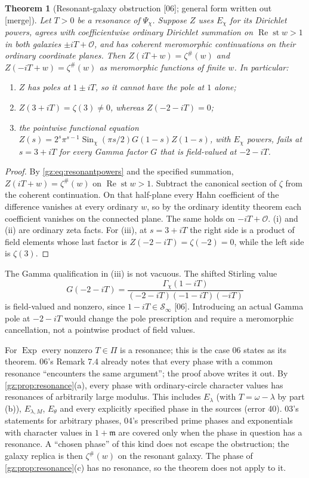 \documentclass[11pt,a4paper]{article}
\numberwithin{equation}{section}
\newtheorem{theorem}{Theorem}[section]
\theoremstyle{definition}
\theoremstyle{remark}
\newcommand{\OO}{\mathcal O}
\newcommand{\mm}{\mathfrak m}
\renewcommand{\Re}{\operatorname{Re}}
\newcommand{\st}{\operatorname{st}}
\newcommand{\Exp}{\operatorname{Exp}}
\newcommand{\Sin}{\operatorname{Sin}}
\newcommand{\zp}{\zeta^{\#}}
\newcommand{\Sinf}{\mathcal S_{\infty}}
\newcommand{\src}[1]{\textup{[#1]}}
\newcommand{\merge}{\textup{[merge]}}
\begin{document}
\begin{theorem}[Resonant-galaxy obstruction \src{06}; general form written out \merge]\label{gz:thm:resonance}
Let $T>0$ be a resonance of $\Psi_\chi$. Suppose $Z$ uses $E_\chi$ for its
Dirichlet powers, agrees with coefficientwise ordinary Dirichlet summation
on $\Re\st w>1$ in both galaxies $\pm iT+\OO$, and has coherent meromorphic
continuations on their ordinary coordinate planes. Then
$Z(iT+w)=\zp(w)$ and $Z(-iT+w)=\zp(w)$ as meromorphic functions of finite $w$.
In particular:
\begin{enumerate}[label=(\roman*)]
\item $Z$ has poles at $1\pm iT$, so it cannot have the pole at $1$ alone;
\item $Z(3+iT)=\zeta(3)\ne0$, whereas $Z(-2-iT)=0$;
\item the pointwise functional equation
 $Z(s)=2^s\pi^{s-1}\Sin_\chi(\pi s/2)G(1-s)Z(1-s)$, with $E_\chi$ powers,
 fails at $s=3+iT$ for every Gamma factor $G$ that is field-valued at
 $-2-iT$.
\end{enumerate}
\end{theorem}
\begin{proof}
By \eqref{gz:eq:resonantpowers} and the specified summation,
$Z(iT+w)=\zp(w)$ on $\Re\st w>1$. Subtract the canonical section of $\zeta$
from the coherent continuation. On that half-plane every Hahn coefficient of
the difference vanishes at every ordinary $w$, so by the ordinary identity
theorem each coefficient vanishes on the connected plane. The same holds on
$-iT+\OO$. (i) and (ii) are ordinary zeta facts. For (iii), at $s=3+iT$ the
right side is a product of field elements whose last factor is
$Z(-2-iT)=\zeta(-2)=0$, while the left side is $\zeta(3)$.
\end{proof}
The Gamma qualification in (iii) is not vacuous. The shifted Stirling value
\[
G(-2-iT)=\frac{\Gamma_\chi(1-iT)}{(-2-iT)(-1-iT)(-iT)}
\]
is field-valued and nonzero, since $1-iT\in\Sinf$ \src{06}. Introducing an
actual Gamma pole at $-2-iT$ would change the pole prescription and require
a meromorphic cancellation, not a pointwise product of field values.

For $\Exp$ every nonzero $T\in\Pi$ is a resonance; this is the case 06
states as its theorem. 06's Remark 7.4 already notes that every phase with
a common resonance ``encounters the same argument''; the proof above writes
it out. By \cref{gz:prop:resonance}(a), every phase with ordinary-circle
character values has resonances of arbitrarily large modulus. This includes
$E_\lambda$ (with $T=\omega-\lambda$ by part (b)), $E_{\lambda,M}$,
$E_\theta$ and every explicitly specified phase in the sources (error 40).
03's statements for arbitrary phases, 04's prescribed prime phases and
exponentials with character values in $1+\mm$ are covered only when the
phase in question has a resonance. A ``chosen phase'' of this kind does
not escape the obstruction; the galaxy replica is then $\zp(w)$ on the
resonant galaxy. The phase of \cref{gz:prop:resonance}(c) has no resonance,
so the theorem does not apply to it.
\end{document}
